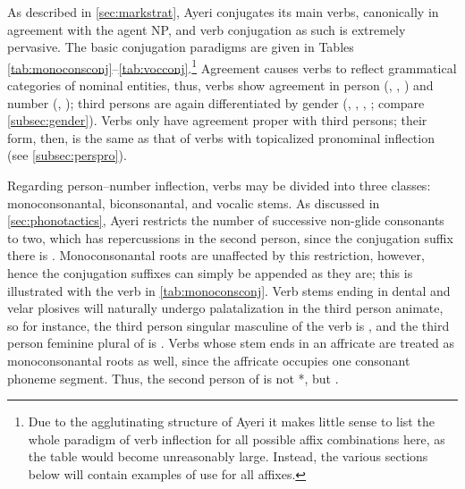 As described in \autoref{sec:markstrat}, Ayeri conjugates its main verbs,
canonically in agreement with the agent NP, and verb conjugation as such is
extremely pervasive. The basic conjugation paradigms are given in Tables
\ref{tab:monoconsconj}--\ref{tab:vocconj}.\footnote{Due to the agglutinating
structure of Ayeri it makes little sense to list the whole paradigm of verb
inflection for all possible affix combinations here, as the table would become
unreasonably large. Instead, the various sections below will contain examples
of use for all affixes.} Agreement causes verbs to reflect grammatical
categories of nominal entities, thus, verbs show agreement in person
(\First{}, \Second{}, \Third{}) and number (\Sg{}, \Pl{}); third persons are
again differentiated by gender (\M{}, \F{}, \N{}, \Inan{}; compare
\autoref{subsec:gender}). Verbs only have agreement proper with third persons;
their form, then, is the same as that of verbs with topicalized pronominal
inflection (see \autoref{subsec:perspro}).

Regarding person--number inflection, verbs may be divided into three classes: 
monoconsonantal, biconsonantal, and vocalic stems. As discussed in 
\autoref{sec:phonotactics}, Ayeri restricts the number of successive non-glide 
consonants to two, which has repercussions in the second person, since the 
conjugation suffix there is . Monoconsonantal roots are 
unaffected by this restriction, however, hence the conjugation suffixes can 
simply be appended as they are; this is illustrated with the verb 
 in \autoref{tab:monoconsconj}. Verb stems 
ending in dental and velar plosives will naturally undergo palatalization in 
the third person animate, so for instance, the third person singular masculine 
of the verb  is , and the third person feminine plural of  is . Verbs whose 
stem ends in an affricate are treated as monoconsonantal roots as well, since 
the affricate occupies one consonant phoneme segment. Thus, the second 
person of  is not *, but 
.

